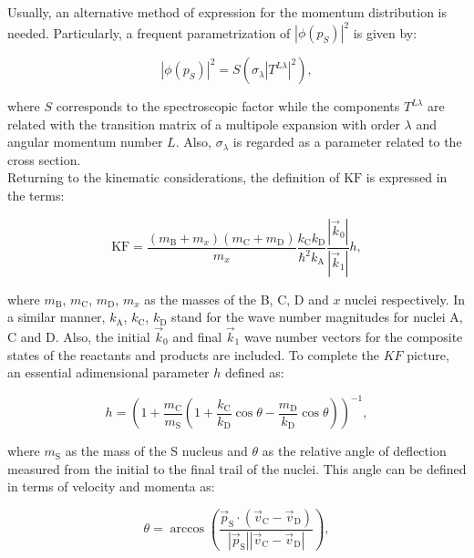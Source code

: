 \documentclass[openany]{book}
\begin{document}
Usually, an alternative method of expression for the momentum distribution is needed. Particularly, a frequent parametrization of $|\phi(p_S)|^2$ is given by:

\begin{equation}\label{eq:special_THM_momentumDistribution}
	|\phi(p_S)|^2  = S (\sigma_{\lambda} |T^{L \lambda}|^2 ),
\end{equation}

where $S$ corresponds to the spectroscopic factor while the components $T^{L\lambda}$ are related with the transition matrix of a multipole expansion with order $\lambda$ and angular momentum number $L$. Also, $\sigma_\lambda$ is regarded as a parameter related to the cross section. \\

Returning to the kinematic considerations, the definition of   $\mathrm{KF}$ is expressed in the terms: 

\begin{equation}\label{eq:special_THM_kinematicFactor}
	\mathrm{KF} = \frac{(m_\mathrm{B} + m_x)(m_\mathrm{C} + m_\mathrm{D})}{m_x} \frac{k_\mathrm{C} k_\mathrm{D}}{\hbar^2 k_\mathrm{A}} \frac{|\vec k_0|}{|\vec k_1|} h,
\end{equation}

where $m_{\mathrm{B}}$,  $m_{\mathrm{C}}$,  $m_{\mathrm{D}}$, $m_x$ as the masses of the B, C, D and $x$ nuclei respectively. In a similar manner, $k_\mathrm{A}$,  $k_\mathrm{C}$, $k_\mathrm{D}$ stand for the wave number magnitudes for nuclei A, C and D. Also, the initial $\vec k_0$ and final $\vec k_1$ wave number vectors for the composite states of the reactants and products are included. To complete the $KF$ picture, an essential adimensional parameter $h$  defined as: 

\begin{equation}\label{eq:special_THM_hParameter}
	 h = \left( 1 + \frac{m_\mathrm{C}}{m_\mathrm{S}} \left( 1 + \frac{k_\mathrm{C}}{k_\mathrm{D}} \cos \theta - \frac{m_\mathrm{D}}{k_\mathrm{D}} \cos \theta \right) \right)^{-1},
\end{equation}

where $m_\mathrm{S}$ as the mass of the S nucleus and $\theta$ as the relative angle of deflection measured from the initial to the final trail of the nuclei. This angle can be defined in terms of velocity and momenta as: 

\begin{equation}\label{eq:special_THM_angle}
	\theta = \arccos {\left( \frac{\vec p_\mathrm{S} \cdot (\vec v_\mathrm{C} - \vec v_\mathrm{D})}{|\vec p_\mathrm{S}| |\vec v_\mathrm{C} - \vec v_\mathrm{D}|} \right)},
\end{equation}
\end{document}
